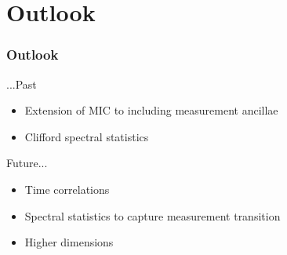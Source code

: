 \documentclass[9pt]{beamer}
\begin{document}


\section{Outlook}

\begin{frame}
\frametitle{Outlook}

...Past
\begin{itemize}
\item Extension of MIC to including measurement ancillae
\item Clifford spectral statistics
\end{itemize}

\vspace{0.5cm}
\pause
Future...
\begin{itemize}
\item Time correlations 
\item Spectral statistics to capture measurement transition
\item Higher dimensions
\end{itemize}

\end{frame}






% 
% 

\end{document}
